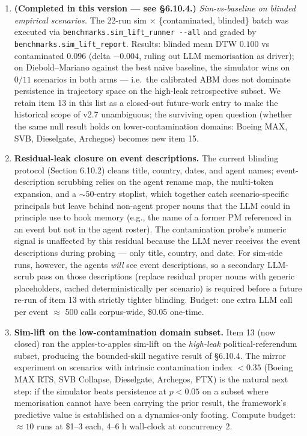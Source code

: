 \documentclass[
]{article}
\begin{document}
\begin{enumerate}
  brief is genuinely global.
\item
  \textbf{(Completed in this version --- see §6.10.4.)}
  \emph{Sim-vs-baseline on blinded empirical scenarios.} The 22-run sim
  × \{contaminated, blinded\} batch was executed via
  \texttt{benchmarks.sim\_lift\_runner\ -\/-all} and graded by
  \texttt{benchmarks.sim\_lift\_report}. Results: blinded mean DTW
  \(0.100\) vs contaminated \(0.096\) (delta \(-0.004\), ruling out LLM
  memorisation as driver); on Diebold--Mariano against the best naive
  baseline, the simulator wins on \(0/11\) scenarios in both arms ---
  i.e.~the calibrated ABM does not dominate persistence in trajectory
  space on the high-leak retrospective subset. We retain item 13 in this
  list as a closed-out future-work entry to make the historical scope of
  v2.7 unambiguous; the surviving open question (whether the same null
  result holds on lower-contamination domains: Boeing MAX, SVB,
  Dieselgate, Archegos) becomes new item 15.
\item
  \textbf{Residual-leak closure on event descriptions.} The current
  blinding protocol (Section 6.10.2) cleans title, country, dates, and
  agent names; event-description scrubbing relies on the agent rename
  map, the multi-token expansion, and a \(\sim 50\)-entry stoplist,
  which together catch scenario-specific principals but leave behind
  non-agent proper nouns that the LLM could in principle use to hook
  memory (e.g., the name of a former PM referenced in an event but not
  in the agent roster). The contamination probe's numeric signal is
  unaffected by this residual because the LLM never receives the event
  descriptions during probing --- only title, country, and date. For
  sim-side runs, however, the agents \emph{will} see event descriptions,
  so a secondary LLM-scrub pass on those descriptions (replace residual
  proper nouns with generic placeholders, cached deterministically per
  scenario) is required before a future re-run of item 13 with strictly
  tighter blinding. Budget: one extra LLM call per event \(\approx\) 500
  calls corpus-wide, \$0.05 one-time.
\item
  \textbf{Sim-lift on the low-contamination domain subset.} Item 13 (now
  closed) ran the apples-to-apples sim-lift on the \emph{high-leak}
  political-referendum subset, producing the bounded-skill negative
  result of §6.10.4. The mirror experiment on scenarios with intrinsic
  contamination index \(< 0.35\) (Boeing MAX RTS, SVB Collapse,
  Dieselgate, Archegos, FTX) is the natural next step: if the simulator
  beats persistence at \(p<0.05\) on a subset where memorisation cannot
  have been carrying the prior result, the framework's predictive value
  is established on a dynamics-only footing. Compute budget:
  \(\approx 10\) runs at \$1--3 each, 4--6 h wall-clock at concurrency
  2.
\end{enumerate}
\end{document}
